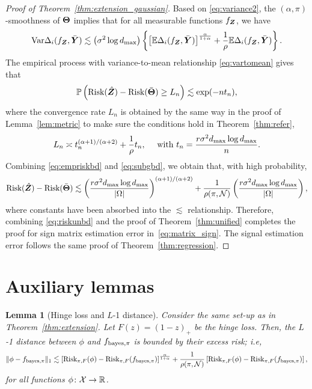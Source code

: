 \documentclass[11pt]{article}
\theoremstyle{plain}
\newtheorem{lem}{Lemma}
\theoremstyle{definition}
\def\bayespif{f_{\textup{bayes},\pi}}
\def\riskF{\textup{Risk}_{\pi,F}}
\begin{document}
\begin{proof}[Proof of Theorem~\ref{thm:extension_gaussian}]
Based on \eqref{eq:variance2}, the $(\alpha,\pi)$-smoothness of $\bm{\Theta}$ implies that for all measurable functions $f_{\bm Z}$, we have
\begin{align}\label{eq:vartomean}
\text{Var}\Delta_i(f_{\bm Z},\bar {\bm Y})\lesssim \left(\sigma^2\log d_{\max}\right) \left\{\left[\mathbb{E}\Delta_i(f_{\bm Z},\bar{\bm Y})\right]^{\alpha\over1+\alpha}+\frac{1}{\rho}\mathbb{E}\Delta_i(f_{\bm Z},\bar{\bm Y})\right\}.
\end{align}
The empirical process with variance-to-mean relationship \eqref{eq:vartomean} gives that
\begin{align}\label{eq:empriskbd}
\mathbb{P	}\left(\text{Risk}(\hat{\bm Z})-\text{Risk}(\bar{\bm{\Theta}})\geq L_n\right)\lesssim \exp(-nt_n),
\end{align}
where the convergence rate $L_n$ is obtained by the same way in the proof of Lemma~\ref{lem:metric} to make sure the conditions hold in Theorem~\ref{thm:refer},  
\begin{align}\label{eq:subgbd}
L_n\asymp t_n^{(\alpha+1)/(\alpha+2)}+\frac{1}{\rho}t_n,\quad\text{ with } t_n =  {r \sigma^2 d_{\max}\log d_{\max}  \over n}.
\end{align}
Combining \eqref{eq:empriskbd} and \eqref{eq:subgbd}, we obtain that, with high probability, 
\begin{align}\label{eq:riskunbd}
   \text{Risk}(\hat{\bm Z})-\text{Risk}(\bar{\bm{\Theta}})\lesssim \left( {r \sigma^2  d_{\max}\log d_{\max}  \over |\Omega|}\right)^{(\alpha+1)/(\alpha+2)}+\frac{1}{\rho(\pi,\mathcal{N})} \left({r \sigma^2  d_{\max} \log d_{\max} \over |\Omega|} \right),
\end{align} 
where constants have been absorbed into the $\lesssim$ relationship. Therefore, combining \eqref{eq:riskunbd} and the proof of Theorem~\ref{thm:unified} completes the proof for sign matrix estimation error in~\eqref{eq:matrix_sign}. The signal estimation error follows the same proof of Theorem~\ref{thm:regression}.
\end{proof}

\clearpage
\section{Auxiliary lemmas}

\begin{lem}[Hinge loss and $L$-1 distance]\label{lem:hingeL1} Consider the same set-up as in Theorem~\ref{thm:extension}. Let $F(z)=(1-z)_{+}$ be the hinge loss. Then, the $L$-1 distance between $\phi$ and $\bayespif$ is bounded by their excess risk; i.e,
\begin{equation}\label{eq:L}
\onenormSize{}{\phi-\bayespif}
\lesssim
\left[\riskF(\phi)-\riskF(\bayespif)\right]^{\alpha\over 1+\alpha}+
 {1\over \rho(\pi, \tN)}\left[\riskF(\phi)-\riskF(\bayespif)\right],
\end{equation}
for all functions $\phi\colon \mathcal{X}\to\mathbb{R}$.
\end{lem}
\end{document}
